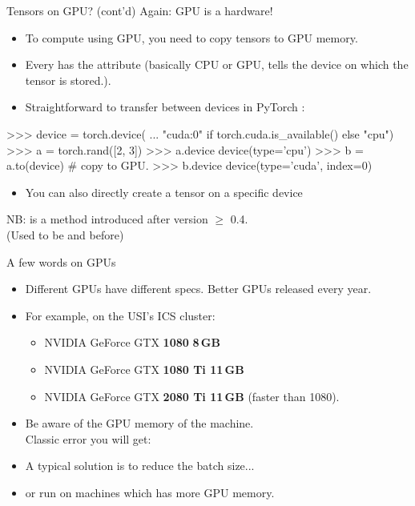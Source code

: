 \begin{frame}[fragile]{Tensors on GPU? (cont'd)}
\vspace{-3mm}
Again: GPU is a hardware!\\
\begin{itemize}
\item To compute using GPU, you need to copy tensors to GPU memory.
\item Every  has the  attribute (basically CPU or GPU, tells the device on which the tensor is stored.).
\item Straightforward to transfer between devices in PyTorch :
\end{itemize}
\begin{python}
>>> device = torch.device(
...     "cuda:0" if torch.cuda.is_available() else "cpu")
>>> a = torch.rand([2, 3])
>>> a.device
device(type='cpu')
>>> b = a.to(device)  # copy to GPU.
>>> b.device
device(type='cuda', index=0)
\end{python}
\begin{itemize}
\item You can also directly create a tensor on a specific device 
\end{itemize}

NB:  is a method introduced after version $\geq$ 0.4.\\ (Used to be  and  before)
\end{frame}

\begin{frame}[fragile]{A few words on GPUs}
\vspace{-3mm}
\begin{itemize}
\item Different GPUs have different specs. Better GPUs released every year.
\item For example, on the USI's ICS cluster:
\begin{itemize}
\item NVIDIA GeForce GTX \textbf{1080} \textbf{8\,GB}
\item NVIDIA GeForce GTX \textbf{1080 Ti 11\,GB}
\item NVIDIA GeForce GTX \textbf{2080 Ti 11\,GB} (faster than 1080).
\end{itemize}
\item Be aware of the GPU memory of the machine.\\
Classic error you will get:\\
\item A typical solution is to reduce the batch size...
\item or run on machines which has more GPU memory.
\end{itemize}

\end{frame}

